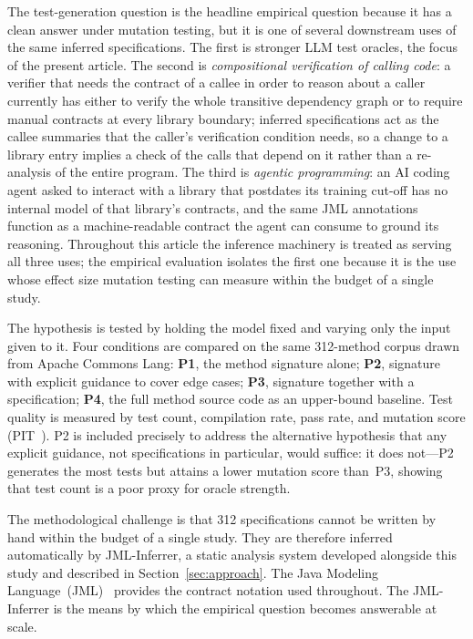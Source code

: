 The test-generation question is the headline empirical question because it has a clean answer under mutation testing, but it is one of several downstream uses of the same inferred specifications. The first is stronger LLM test oracles, the focus of the present article. The second is \emph{compositional verification of calling code}: a verifier that needs the contract of a callee in order to reason about a caller currently has either to verify the whole transitive dependency graph or to require manual contracts at every library boundary; inferred specifications act as the callee summaries that the caller's verification condition needs, so a change to a library entry implies a check of the calls that depend on it rather than a re-analysis of the entire program. The third is \emph{agentic programming}: an AI coding agent asked to interact with a library that postdates its training cut-off has no internal model of that library's contracts, and the same JML annotations function as a machine-readable contract the agent can consume to ground its reasoning. Throughout this article the inference machinery is treated as serving all three uses; the empirical evaluation isolates the first one because it is the use whose effect size mutation testing can measure within the budget of a single study.

The hypothesis is tested by holding the model fixed and varying only the input given to it. Four conditions are compared on the same 312-method corpus drawn from Apache Commons Lang: \textbf{P1}, the method signature alone; \textbf{P2}, signature with explicit guidance to cover edge cases; \textbf{P3}, signature together with a specification; \textbf{P4}, the full method source code as an upper-bound baseline. Test quality is measured by test count, compilation rate, pass rate, and mutation score (PIT~\cite{coles2016pitest}). P2 is included precisely to address the alternative hypothesis that any explicit guidance, not specifications in particular, would suffice: it does not---P2 generates the most tests but attains a lower mutation score than~P3, showing that test count is a poor proxy for oracle strength.

The methodological challenge is that 312 specifications cannot be written by hand within the budget of a single study. They are therefore inferred automatically by JML-Inferrer, a static analysis system developed alongside this study and described in Section~\ref{sec:approach}. The Java Modeling Language~(JML)~\cite{jml,leavens2006design} provides the contract notation used throughout. The JML-Inferrer is the means by which the empirical question becomes answerable at scale.

